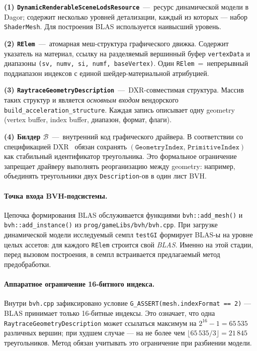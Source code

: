 \noindent
\textbf{(1) \texttt{DynamicRenderableSceneLodsResource}}~---~ресурс
динамической модели в Dagor; содержит несколько уровней детализации, каждый из
которых --- набор \texttt{ShaderMesh}. Для построения BLAS
используется наивысший уровень.

\noindent
\textbf{(2) \texttt{RElem}}~---~атомарная меш-структура графического движка. Содержит
указатель на материал, ссылку на разделяемый вершинный буфер
\texttt{vertexData} и диапазоны \texttt{(sv, numv, si, numf,
baseVertex)}. Один \texttt{RElem}~=~непрерывный поддиапазон
индексов с единой шейдер-материальной атрибуцией.

\noindent
\textbf{(3) \texttt{RaytraceGeometryDescription}}~---~DXR-совместимая
структура.
Массив таких структур и является \emph{основным входом}
вендорского \texttt{build\_acceleration\_structure}. Каждая запись описывает
одну geometry (vertex buffer, index buffer, диапазон, формат,
флаги).

\noindent
\textbf{(4) Билдер $\mathcal{B}$}~---~внутренний код графического
драйвера. В соответствии со спецификацией DXR~\cite{dxrSpec}
обязан сохранять
$(\texttt{GeometryIndex},\,\texttt{PrimitiveIndex})$ как стабильный
идентификатор треугольника. Это формальное ограничение запрещает
драйверу выполнять реорганизацию между geometry: например,
объединять треугольники двух \texttt{Description}-ов в один лист
BVH.

\paragraph{Точка входа BVH-подсистемы.} Цепочка формирования BLAS
обслуживается функциями \texttt{bvh::add\_mesh()} и
\texttt{bvh::add\_instance()} из
\texttt{prog/gameLibs/bvh/bvh.cpp}. При загрузке динамической
модели исследуемый семпл \texttt{testGI} формирует BLAS-ы
на уровне целых ассетов: для каждого \texttt{RElem} строится свой \emph{BLAS}.
Именно на этой стадии, перед вызовом построения, в семпл встраивается предлагаемый метод предобработки.

\paragraph{Аппаратное ограничение 16-битного индекса.} Внутри
\texttt{bvh.cpp} зафиксировано условие
\texttt{G\_ASSERT(mesh.indexFormat == 2)} --- BLAS принимает только
16-битные индексы. Это означает, что одна
\texttt{RaytraceGeometryDescription} может ссылаться максимум на
$2^{16}\!-\!1 = 65\,535$ различных вершин; при 
худшем случае --- на не более чем
$\lfloor 65\,535 / 3 \rfloor = 21\,845$ треугольников. Метод
обязан учитывать это ограничение при разбиении модели.

